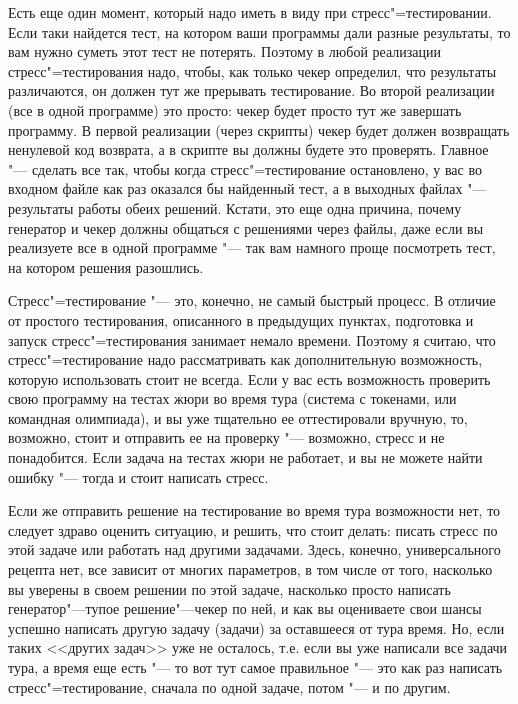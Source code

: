 \documentclass[a4paper,10pt]{problems}
\begin{document}
Есть еще один момент, который надо иметь в виду при стресс"=тестировании. 
Если таки найдется тест, на котором ваши программы дали разные результаты, то вам нужно суметь этот тест не потерять. 
Поэтому в любой реализации стресс"=тестирования надо, чтобы, как только чекер определил, что результаты различаются,
он должен тут же прерывать тестирование. 
Во второй реализации (все в одной программе) это просто: чекер будет просто тут же завершать программу.
В первой реализации (через скрипты) чекер будет должен возвращать ненулевой код возврата, 
а в скрипте вы должны будете это проверять. 
Главное "--- сделать все так, чтобы когда стресс"=тестирование остановлено, у вас во входном файле
как раз оказался бы найденный тест, а в выходных файлах "--- результаты работы обеих решений.
Кстати, это еще одна причина, почему генератор и чекер должны общаться с решениями через файлы, даже если вы реализуете все в одной программе "---
так вам намного проще посмотреть тест, на котором решения разошлись.

Стресс"=тестирование "--- это, конечно, не самый быстрый процесс. 
В отличие от простого тестирования, описанного в предыдущих пунктах, подготовка и запуск стресс"=тестирования занимает немало времени.
Поэтому я считаю, что стресс"=тестирование надо рассматривать как дополнительную возможность, которую использовать стоит не всегда.
Если у вас есть возможность проверить свою программу на тестах жюри во время тура (система с токенами, или командная олимпиада), 
и вы уже тщательно ее оттестировали вручную, то, возможно, стоит и отправить ее на проверку "--- возможно, стресс и не понадобится.
Если задача на тестах жюри не работает, и вы не можете найти ошибку "--- тогда и стоит написать стресс.

Если же отправить решение на тестирование во время тура возможности нет, то следует здраво оценить ситуацию, и решить, что стоит делать:
писать стресс по этой задаче или работать над другими задачами. 
Здесь, конечно, универсального рецепта нет, все зависит от многих параметров, 
в том числе от того, насколько вы уверены в своем решении по этой задаче, насколько просто написать генератор"---тупое решение"---чекер по ней,
и как вы оцениваете свои шансы успешно написать другую задачу (задачи) за оставшееся от тура время. 
Но, если таких <<других задач>> уже не осталось, т.е. если вы уже написали все задачи тура, а время еще есть "--- то вот тут самое правильное "---
это как раз написать стресс"=тестирование, сначала по одной задаче, потом "--- и по другим.
\end{document}
